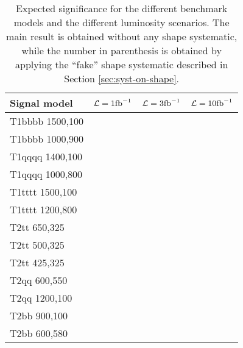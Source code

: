\begin{table}
  \centering
  \caption{Expected significance for the different benchmark models and the different luminosity scenarios. 
  The main result is obtained without any shape systematic, while the number in parenthesis is obtained by applying 
  the ``fake'' shape systematic described in Section \ref{sec:syst-on-shape}.}
  \label{tab:results_signif}
  \footnotesize
  \begin{tabular}{lccc}
    \hline
    \hline
    Signal model & $\mathcal{L} = 1 \ifb$ & $\mathcal{L} = 3 \ifb$ & $\mathcal{L} = 10 \ifb$ \\
    \hline
    \hline
    T1bbbb 1500,100 &   &   &   \\
    T1bbbb 1000,900 &   &   &   \\
    T1qqqq 1400,100 &   &   &   \\
    T1qqqq 1000,800 &   &   &   \\
    T1tttt 1500,100 &   &   &   \\
    T1tttt 1200,800 &   &   &   \\
    T2tt 650,325    &   &   &   \\
    T2tt 500,325    &   &   &   \\
    T2tt 425,325    &   &   &   \\
    T2qq 600,550    &   &   &   \\
    T2qq 1200,100   &   &   &   \\
    T2bb 900,100    &   &   &   \\
    T2bb 600,580    &   &   &   \\
    \hline
    \hline
  \end{tabular} 
\end{table}


